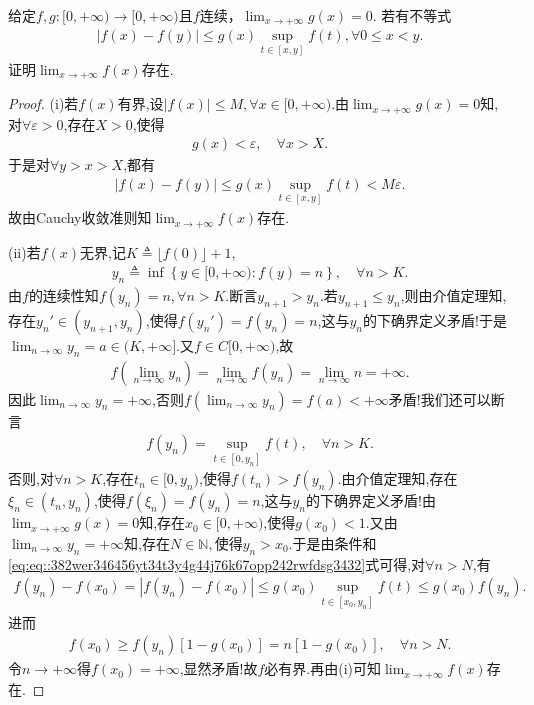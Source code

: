 \documentclass[../../main.tex]{subfiles}%
\begin{document}
\begin{example}
给定$f,g:[0,+\infty) \to [0,+\infty)$且$f$连续，$\lim_{x \to +\infty} g(x) = 0$. 若有不等式
\begin{align*}
|f(x) - f(y)| \leqslant g(x) \sup_{t \in [x,y]} f(t), \forall 0 \leqslant x < y.
\end{align*}
证明$\lim_{x \to +\infty} f(x)$存在.
\end{example}
\begin{proof}
(i)若$f(x)$有界,设$|f(x)| \leqslant M, \forall x \in [0,+\infty)$.由$\lim_{x \to +\infty} g(x) = 0$知,对$\forall \varepsilon > 0$,存在$X > 0$,使得
\begin{align*}
g(x) < \varepsilon, \quad \forall x > X.
\end{align*}
于是对$\forall y > x > X$,都有
\begin{align*}
|f(x) - f(y)| \leqslant g(x) \sup_{t \in [x,y]} f(t) < M\varepsilon.
\end{align*}
故由Cauchy收敛准则知$\lim_{x \to +\infty} f(x)$存在.

(ii)若$f(x)$无界,记$K \triangleq \lfloor f(0) \rfloor + 1$,
\begin{align*}
y_n \triangleq \inf \left\{ y \in [0,+\infty) : f(y) = n \right\},\quad  \forall n > K.
\end{align*}
由$f$的连续性知$f(y_n) = n, \forall n > K$.断言$y_{n+1} > y_n$.若$y_{n+1} \leqslant y_n$,则由介值定理知,存在$y_n' \in (y_{n+1}, y_n)$,使得$f(y_n') = f(y_n) = n$,这与$y_n$的下确界定义矛盾!于是$\lim_{n \to \infty} y_n = a \in (K, +\infty]$.又$f \in C[0,+\infty)$,故
\begin{align*}
f\left( \lim_{n \to \infty} y_n \right) = \lim_{n \to \infty} f(y_n) = \lim_{n \to \infty} n = +\infty.
\end{align*}
因此$\lim_{n \to \infty} y_n = +\infty$,否则$f\left( \lim_{n \to \infty} y_n \right) = f(a) < +\infty$矛盾!我们还可以断言
\begin{align}
f(y_n) = \sup_{t \in [0,y_n]} f(t), \quad \forall n > K. \label{eq:eq::382wer346456yt34t3y4g44j76k67opp242rwfdsg3432}
\end{align}
否则,对$\forall n > K$,存在$t_n \in [0,y_n)$,使得$f(t_n) > f(y_n)$.由介值定理知,存在$\xi_n \in (t_n, y_n)$,使得$f(\xi_n) = f(y_n) = n$,这与$y_n$的下确界定义矛盾!由$\lim_{x\to +\infty}g(x)=0$知,存在$x_0 \in [0,+\infty)$,使得$g(x_0)<1$.又由$\lim_{n\to\infty}y_n=+\infty$知,存在$N\in \mathbb{N},$使得$y_n>x_0$.于是由条件和\eqref{eq:eq::382wer346456yt34t3y4g44j76k67opp242rwfdsg3432}式可得,对$\forall n > N$,有
\begin{align*}
f(y_n) - f(x_0) = |f(y_n) - f(x_0)| \leqslant g(x_0) \sup_{t \in [x_0,y_n]} f(t) \leqslant g(x_0) f(y_n).
\end{align*}
进而
\begin{align*}
f(x_0) \geqslant f(y_n) \left[ 1 - g(x_0) \right] = n \left[ 1 - g(x_0) \right], \quad \forall n > N.
\end{align*}
令$n \to +\infty$得$f(x_0) = +\infty$,显然矛盾!故$f$必有界.再由(i)可知$\lim_{x \to +\infty} f(x)$存在.
\end{proof}
\end{document}
